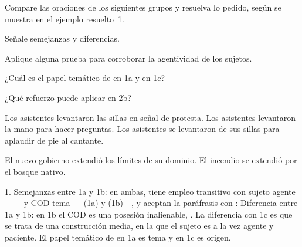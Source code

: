 \begin{ejercicio}\label{ej:10-levantar}
Compare las oraciones de los siguientes grupos y resuelva lo pedido, según se
muestra en el ejemplo resuelto~1.

\begin{consignas}
  \item Señale semejanzas y diferencias.
  \item Aplique alguna prueba para corroborar la agentividad de los sujetos.
  \item ¿Cuál es el papel temático de  en 1a y en 1c?
  \item ¿Qué refuerzo puede aplicar en 2b?
\end{consignas}

\begin{exe}
  \ex
    \begin{xlist}
      \ex Los asistentes levantaron las sillas en señal de protesta.
      \ex Los asistentes levantaron la mano para hacer preguntas.
      \ex Los asistentes se levantaron de sus sillas para aplaudir de pie al
          cantante.
    \end{xlist}
  \ex
    \begin{xlist}
      \ex El nuevo gobierno extendió los límites de su dominio.
      \ex El incendio se extendió por el bosque nativo.
    \end{xlist}
\end{exe}

\begin{resuelto}
1. Semejanzas entre 1a y 1b: en ambas,  tiene empleo transitivo
con sujeto agente ------ y COD tema ---
(1a) y  (1b)---, y aceptan la paráfrasis con :
 Diferencia entre 1a y 1b: en 1b el COD es
una posesión inalienable, . La diferencia con 1c es que se trata
de una construcción media, en la que el sujeto es a la vez agente y paciente. El
papel temático de  en 1a es tema y en 1c es
origen.
\end{resuelto}
\end{ejercicio}

